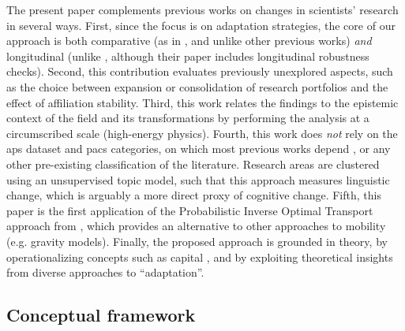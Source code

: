 \documentclass{article}
\begin{document}
The present paper complements previous works on changes in scientists' research in several ways. First, since the focus is on adaptation strategies, the core of our approach is both comparative (as in \citealt{Tripodi2020}, and unlike other previous works) \textit{and} longitudinal (unlike \citealt{Tripodi2020}, although their paper includes longitudinal robustness checks). Second, this contribution evaluates previously unexplored aspects, such as the choice between expansion or consolidation of research portfolios and the effect of affiliation stability. %
Third, this work relates the findings to the epistemic context of the field and its transformations by performing the analysis at a circumscribed scale (high-energy physics). Fourth, this work does \textit{not} rely on the \gls{aps} dataset and \gls{pacs} categories, on which most previous works depend \citep{Jia2017,Aleta2019,Battiston2019,Tripodi2020}, or any other pre-existing classification of the literature. Research areas are clustered using an unsupervised topic model, such that this approach measures linguistic change, which is arguably a more direct proxy of cognitive change. Fifth, this paper is the first application of the Probabilistic Inverse Optimal Transport approach from \citealt{pmlr-v162-chiu22b}, which provides an alternative to other approaches to mobility (e.g. gravity models). Finally, the proposed approach is grounded in theory, by operationalizing concepts such as capital \citep{Bourdieu1980,Bourdieu1986}, and by exploiting theoretical insights from diverse approaches to ``adaptation''.

\subsection{\label{sec:conceptual}Conceptual framework}
\end{document}
